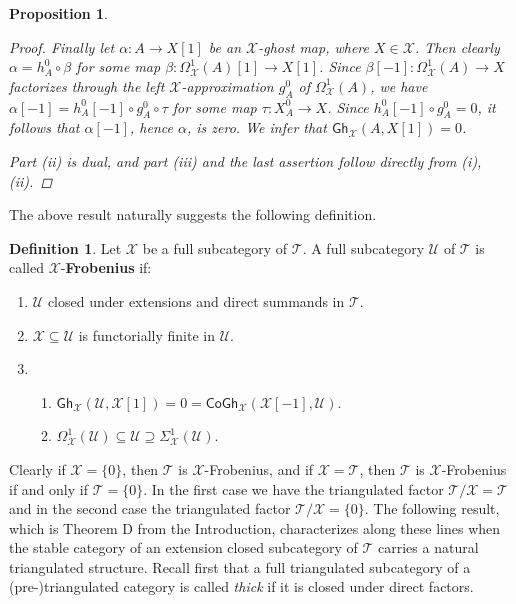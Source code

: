 \documentclass[oneside, a4paper,reqno]{amsart}
\numberwithin{equation}{section}
\newtheorem{prop}[thm]{Proposition}
\theoremstyle{definition}
\newtheorem{defn}[thm]{Definition}
\begin{document}
\begin{prop}
\begin{proof}
Finally let $\alpha \colon A {\longrightarrow} X[1]$ be an ${\mathcal X}$-ghost map, where $X \in {\mathcal X}$. Then clearly $\alpha = h^{0}_{A} \circ \beta$ for some map $\beta \colon \Omega^{1}_{\mathcal X}(A)[1] {\longrightarrow} X[1]$. Since $\beta[-1] \colon \Omega^{1}_{\mathcal X}(A) {\longrightarrow} X$ factorizes through the left ${\mathcal X}$-approximation $g^{0}_{A}$ of $\Omega^{1}_{\mathcal X}(A)$,  we have $\alpha[-1] = h^{0}_{A}[-1] \circ g^{0}_{A} \circ \tau$ for some map $\tau \colon X^{0}_{A} {\longrightarrow} X$. Since $h^{0}_{A}[-1] \circ g^{0}_{A} = 0$, it follows that  $\alpha[-1]$, hence $\alpha$, is zero. We infer that $\mathsf{Gh}_{\mathcal X}(A,X[1]) = 0$.    

Part (ii) is dual, and part (iii) and the last assertion follow directly from (i), (ii).  
\end{proof} 
\end{prop}

The above result naturally suggests the following definition. 

\begin{defn} Let ${\mathcal X}$ be a full subcategory of ${\mathcal T}$. A full subcategory ${\mathcal U}$ of ${\mathcal T}$ is called ${\mathcal X}$-{\bf Frobenius} if:
\begin{enumerate}
\item ${\mathcal U}$ closed under extensions and direct summands in ${\mathcal T}$.  
\item ${\mathcal X} \subseteq {\mathcal U}$ is functorially finite in ${\mathcal U}$. 
\item \begin{enumerate}
\item $\mathsf{Gh}_{\mathcal X}({\mathcal U},{\mathcal X}[1]) = 0 = \mathsf{CoGh}_{\mathcal X}({\mathcal X}[-1], {\mathcal U})$.
\item $\Omega^{1}_{\mathcal X}({\mathcal U}) \subseteq {\mathcal U} \supseteq\Sigma^{1}_{\mathcal X}({\mathcal U})$.
\end{enumerate} 
\end{enumerate}
\end{defn}

Clearly if ${\mathcal X} = \{0\}$, then ${\mathcal T}$ is ${\mathcal X}$-Frobenius, and if ${\mathcal X} = {\mathcal T}$, then ${\mathcal T}$ is ${\mathcal X}$-Frobenius if and only if ${\mathcal T} = \{0\}$. In the first case we have the triangulated factor ${\mathcal T}/{\mathcal X} = {\mathcal T}$ and in the second case the triangulated factor ${\mathcal T}/{\mathcal X} = \{0\}$. 
The following result, which is Theorem D from the Introduction,  characterizes along these lines when the stable category of an extension closed subcategory of ${\mathcal T}$ carries a natural triangulated structure. Recall first that a full triangulated subcategory of a (pre-)triangulated category is called {\em thick} if it is closed under direct factors.    
\end{document}
